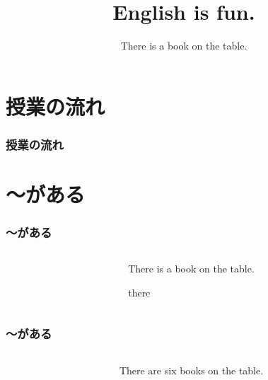 \documentclass[aspectratio=169]{beamer}
\title{English is fun.}
\subtitle{There is a book on the table.}
\author{}
\institute[]{}
\date[]
\newcommand{\myaudio}[1]{\href{#1}{\faVolumeUp}}
\begin{document}
\begin{frame}[plain]
  \titlepage
\end{frame}

\section*{授業の流れ}
\begin{frame}[plain]
  \frametitle{授業の流れ}
  \tableofcontents
\end{frame}

\section{〜がある}

\begin{frame}[plain]\frametitle{〜がある}
\begin{columns}[T]
\begin{column}{.4\textwidth}
\end{column}\pause
\begin{column}{.55\textwidth}\LARGE
There is a book on the table.

\hfill{\small there }
\end{column}
\end{columns}
\vfill
\mbox{}\hfill\myaudio{./audio/001_there_is_01.mp3}

\end{frame}
\begin{frame}[plain]\frametitle{〜がある}
\begin{columns}
\begin{column}{.3\textwidth}
\end{column}\pause
\begin{column}{.65\textwidth}\LARGE
There are six books on the table.
\end{column}
\end{columns}
\vfill
\mbox{}\hfill\myaudio{./audio/001_there_is_02.mp3}
\end{frame}
\end{document}

